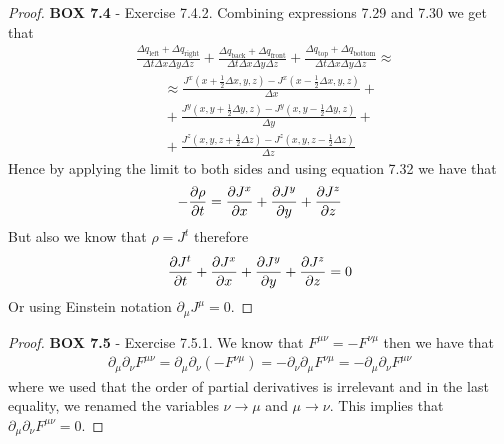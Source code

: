 \documentclass[11pt]{article}
\theoremstyle{definition}
\begin{document}
\cleardoublepage
\begin{proof}{\textbf{BOX 7.4} - Exercise 7.4.2.}
    Combining expressions 7.29 and 7.30 we get that
    \begin{align*}
        &\frac{\Delta q_{\text{left}} + \Delta q_{\text{right}}
        }{\Delta t\Delta x \Delta y\Delta z}
        +
        \frac{\Delta q_{\text{back}} + \Delta q_{\text{front}}
        }{\Delta t\Delta x \Delta y\Delta z}
        +
        \frac{\Delta q_{\text{top}} + \Delta q_{\text{bottom}}
        }{\Delta t\Delta x \Delta y\Delta z} \approx\\
        &\qquad\approx \frac{J^x(x + \frac{1}{2}\Delta x, y, z) 
        - J^x(x - \frac{1}{2}\Delta x, y, z)}{\Delta x} +\\
        &\qquad+ \frac{J^y(x, y + \frac{1}{2}\Delta y, z) 
        - J^y(x, y - \frac{1}{2}\Delta y, z)}{\Delta y} +\\
        &\qquad+ \frac{J^z(x, y, z + \frac{1}{2}\Delta z) 
        - J^z(x, y, z - \frac{1}{2}\Delta z)}{\Delta z}
    \end{align*}
    Hence by applying the limit to both sides and using equation 7.32 we have that
    \begin{align*}
        -\partialderivative{\rho}{t} = \partialderivative{J^x}{x}
        + \partialderivative{J^y}{y} + \partialderivative{J^z}{z}
    \end{align*}
    But also we know that $\rho = J^t$ therefore
    \begin{align*}
        \partialderivative{J^t}{t} + \partialderivative{J^x}{x}
         + \partialderivative{J^y}{y} + \partialderivative{J^z}{z} = 0
    \end{align*}
    Or using Einstein notation $\partial_\mu J^\mu = 0$.
\end{proof}
\begin{proof}{\textbf{BOX 7.5} - Exercise 7.5.1.}
    We know that $F^{\mu\nu} = -F^{\nu\mu}$ then we have that
    \begin{align*}
        \partial_\mu\partial_\nu F^{\mu\nu}
        = \partial_\mu\partial_\nu (-F^{\nu\mu})
        = -\partial_\nu\partial_\mu F^{\nu\mu}
        = -\partial_\mu\partial_\nu F^{\mu\nu}
    \end{align*}
    where we used that the order of partial derivatives is irrelevant
    and in the last equality, we renamed the variables
    $\nu \to \mu$ and $\mu \to \nu$.
    This implies that $\partial_\mu\partial_\nu F^{\mu\nu} = 0$.
\end{proof}
\end{document}
